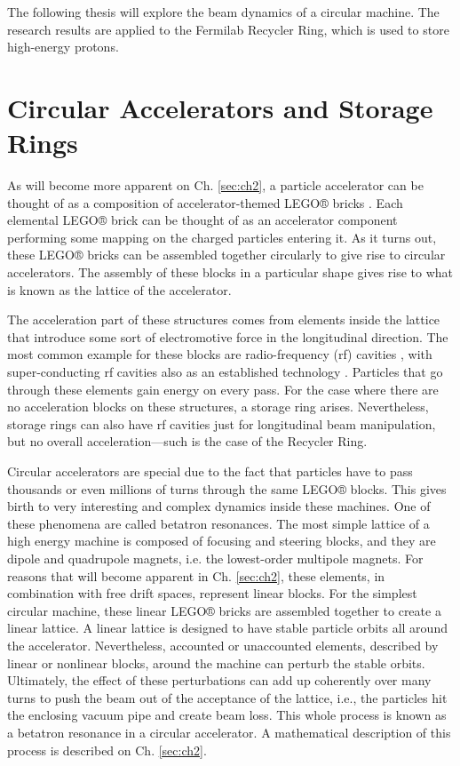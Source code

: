 The following thesis will explore the beam dynamics of a circular machine. The research results are applied to the Fermilab Recycler Ring, which is used to store high-energy protons.

\section{Circular Accelerators and Storage Rings}

As will become more apparent on Ch. \ref{sec:ch2}, a particle accelerator can be thought of as a composition of accelerator-themed LEGO® bricks \cite{forest}. Each elemental LEGO® brick can be thought of as an accelerator component performing some mapping on the charged particles entering it. As it turns out, these LEGO® bricks can be assembled together circularly to give rise to circular accelerators. The assembly of these blocks in a particular shape gives rise to what is known as the lattice of the accelerator.

The acceleration part of these structures comes from elements inside the lattice that introduce some sort of electromotive force in the longitudinal direction. The most common example for these blocks are radio-frequency (rf) cavities \cite{sylee}, with super-conducting rf cavities also as an established technology \cite{srfcavs}. Particles that go through these elements gain energy on every pass. For the case where there are no acceleration blocks on these structures, a storage ring arises. Nevertheless, storage rings can also have rf cavities just for longitudinal beam manipulation, but no overall acceleration---such is the case of the Recycler Ring.    

Circular accelerators are special due to the fact that particles have to pass thousands or even millions of turns through the same LEGO® blocks. This gives birth to very interesting and complex dynamics inside these machines. One of these phenomena are called betatron resonances. The most simple lattice of a high energy machine is composed of focusing and steering blocks, and they are dipole and quadrupole magnets, i.e. the lowest-order multipole magnets. For reasons that will become apparent in Ch. \ref{sec:ch2}, these elements, in combination with free drift spaces, represent linear blocks. For the simplest circular machine, these linear LEGO® bricks are assembled together to create a linear lattice. A linear lattice is designed to have stable particle orbits all around the accelerator. Nevertheless, accounted or unaccounted elements, described by linear or nonlinear blocks, around the machine can perturb the stable orbits. Ultimately, the effect of these perturbations can add up coherently over many turns to push the beam out of the acceptance of the lattice, i.e., the particles hit the enclosing vacuum pipe and create beam loss. This whole process is known as a betatron resonance in a circular accelerator. A mathematical description of this process is described on Ch. \ref{sec:ch2}.

